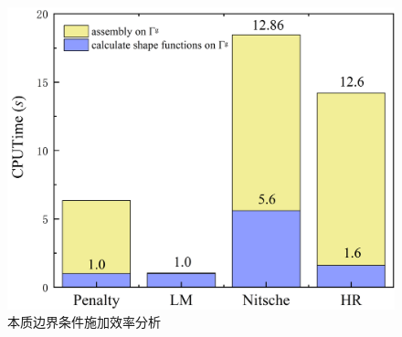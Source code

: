 \begin{figure}[!h]
    \centering
    \includegraphics[scale=0.5]{figure/cantilever/caculate.png}
    \caption{本质边界条件施加效率分析}\label{Ccaculate}
\end{figure}\newpage

